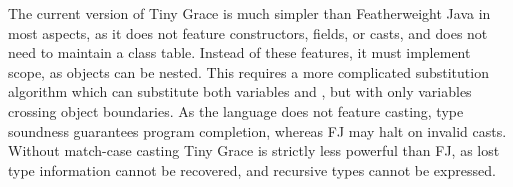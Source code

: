 \noindent The current version of Tiny Grace is much simpler than Featherweight
Java in most aspects, as it does not feature constructors, fields, or casts, and
does not need to maintain a class table.  Instead of these features, it must
implement scope, as objects can be nested.  This requires a more complicated
substitution algorithm which can substitute both variables and \self, but with
only variables crossing object boundaries.  As the language does not feature
casting, type soundness guarantees program completion, whereas FJ may halt on
invalid casts.  Without match-case casting Tiny Grace is strictly less powerful
than FJ, as lost type information cannot be recovered, and recursive types
cannot be expressed.

